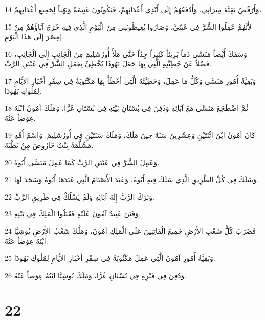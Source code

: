 \par 14 وَأَرْفُضُ بَقِيَّةَ مِيرَاثِي، وَأَدْفَعُهُمْ إِلَى أَيْدِي أَعْدَائِهِمْ، فَيَكُونُونَ غَنِيمَةً وَنَهْباً لِجَمِيعِ أَعْدَائِهِمْ،
\par 15 لأَنَّهُمْ عَمِلُوا الشَّرَّ فِي عَيْنَيَّ، وَصَارُوا يُغِيظُونَنِي مِنَ الْيَوْمِ الَّذِي فِيهِ خَرَجَ آبَاؤُهُمْ مِنْ مِصْرَ إِلَى هَذَا الْيَوْمِ].
\par 16 وَسَفَكَ أَيْضاً مَنَسَّى دَماً بَرِيئاً كَثِيراً جِدّاً حَتَّى مَلَأَ أُورُشَلِيمَ مِنَ الْجَانِبِ إِلَى الْجَانِبِ، فَضْلاً عَنْ خَطِيَّتِهِ الَّتِي بِهَا جَعَلَ يَهُوذَا يُخْطِئُ بِعَمَلِ الشَّرِّ فِي عَيْنَيِ الرَّبِّ.
\par 17 وَبَقِيَّةُ أُمُورِ مَنَسَّى وَكُلُّ مَا عَمِلَ، وَخَطِيَّتُهُ الَّتِي أَخْطَأَ بِهَا مَكْتُوبَةٌ فِي سِفْرِ أَخْبَارِ الأَيَّامِ لِمُلُوكِ يَهُوذَا.
\par 18 ثُمَّ اضْطَجَعَ مَنَسَّى مَعَ آبَائِهِ وَدُفِنَ فِي بُسْتَانِ بَيْتِهِ فِي بُسْتَانِ عُزَّا، وَمَلَكَ آمُونُ ابْنُهُ عِوَضاً عَنْهُ.
\par 19 كَانَ آمُونُ ابْنَ اثْنَتَيْنِ وَعِشْرِينَ سَنَةً حِينَ مَلَكَ، وَمَلَكَ سَنَتَيْنِ فِي أُورُشَلِيمَ. وَاسْمُ أُمِّهِ مَشُلَّمَةُ بِنْتُ حَارُوصَ مِنْ يَطْبَةَ.
\par 20 وَعَمِلَ الشَّرَّ فِي عَيْنَيِ الرَّبِّ كَمَا عَمِلَ مَنَسَّى أَبُوهُ.
\par 21 وَسَلَكَ فِي كُلِّ الطَّرِيقِ الَّذِي سَلَكَ فِيهِ أَبُوهُ، وَعَبَدَ الأَصْنَامَ الَّتِي عَبَدَهَا أَبُوهُ وَسَجَدَ لَهَا.
\par 22 وَتَرَكَ الرَّبَّ إِلَهَ آبَائِهِ وَلَمْ يَسْلُكْ فِي طَرِيقِ الرَّبِّ.
\par 23 وَفَتَنَ عَبِيدُ آمُونَ عَلَيْهِ فَقَتَلُوا الْمَلِكَ فِي بَيْتِهِ.
\par 24 فَضَرَبَ كُلُّ شَعْبِ الأَرْضِ جَمِيعَ الْفَاتِنِينَ عَلَى الْمَلِكِ آمُونَ، وَمَلَّكَ شَعْبُ الأَرْضِ يُوشِيَّا ابْنَهُ عِوَضاً عَنْهُ.
\par 25 وَبَقِيَّةُ أُمُورِ آمُونَ الَّتِي عَمِلَ مَكْتُوبَةٌ فِي سِفْرِ أَخْبَارِ الأَيَّامِ لِمُلُوكِ يَهُوذَا.
\par 26 وَدُفِنَ فِي قَبْرِهِ فِي بُسْتَانِ عُزَّا، وَمَلَكَ يُوشِيَّا ابْنُهُ عِوَضاً عَنْهُ.

\chapter{22}

